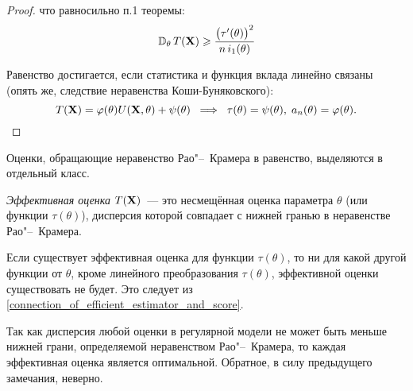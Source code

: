 \begin{proof}
    что равносильно п.1 теоремы:
    \begin{equation*}
        \operatorname{\mathbb{D}_{\theta}} T(\mathbf{X}) \geqslant \cfrac{\bigl(\tau'(\theta)\bigr)^{2}}{n \, i_1(\theta)}
    \end{equation*}

    Равенство достигается, если статистика и функция вклада линейно связаны (опять же, следствие неравенства Коши-Буняковского):
    \begin{equation}
        \label{connection_of_efficient_estimator_and_score}
        T(\mathbf{X})=\varphi(\theta) U(\mathbf{X}, \theta)+\psi(\theta) 
        \; \implies \;
        \tau(\theta)=\psi(\theta), \; a_{n}(\theta)=\varphi(\theta).
    \end{equation}
\end{proof}

\iffalse
    Рассмотрим некоторый класс оценок $K=\left\{\hat{\theta}\left(\SampleX\right)\right\}$ параметра $\theta$.
    \begin{defn}
        Говорят, что оценка $\theta^{*}\left(\SampleX\right) \in K$ является эффективной оценкой параметра $\theta$ в классе $K$, если для любой другой оценки $\hat{\theta} \in K$ имеет место неравенство:
        \begin{equation*}
            E\left(\theta^{*}-\theta\right)^{2} \leqslant \ExpTh(\hat{\theta}-\theta)^{2}~ \forall \theta \in \Theta
        \end{equation*}
    \end{defn}
    Обозначим класс несмещённых оценок:
    \begin{equation*}
        K_{0}=\left\{\hat{\theta}\left(\SampleX\right): E \hat{\theta}=\theta, \forall \theta \in \Theta\right\}
    \end{equation*}
    Оценка, эффективная в $K_0$ называется просто \textit{эффективной}.

    Для оценки $\theta^{*} \in K_{0}$ по определению дисперсии
    \begin{equation*}
        \ExpTh\left(\theta^{*}-\theta\right)^{2}=\ExpTh\left(\theta^{*}-\ExpTh \theta^{*}\right)^{2}=\VarTh \theta^{*}
    \end{equation*}
\fi

Оценки, обращающие неравенство Рао"--~Крамера в равенство, выделяются в отдельный класс.
\begin{defn}
    \textit{Эффективная оценка} $T(\mathbf{X})$~--- это несмещённая оценка параметра $\theta$ (или функции $\tau(\theta)$), дисперсия которой совпадает с нижней гранью в неравенстве Рао"--~Крамера.
\end{defn}

\begin{rmrk}
    Если существует эффективная оценка для функции $\tau(\theta)$, то ни для какой другой функции от $\theta$, кроме линейного преобразования $\tau(\theta)$, эффективной оценки существовать не будет. 
    Это следует из \eqref{connection_of_efficient_estimator_and_score}.
\end{rmrk}
Так как дисперсия любой оценки в регулярной модели не может быть меньше нижней грани, определяемой неравенством Рао"--~Крамера, то каждая эффективная оценка является оптимальной.
Обратное, в силу предыдущего замечания, неверно.
